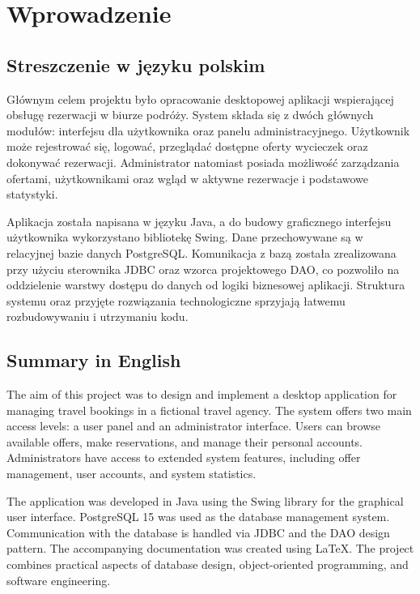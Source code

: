 \chapter{Wprowadzenie}
\label{cha:wprowadzenie}


\section{Streszczenie w języku polskim}
\label{sec:Streszczenie w języku polskim}

Głównym celem projektu było opracowanie desktopowej aplikacji wspierającej obsługę rezerwacji w biurze podróży. System składa się z dwóch głównych modułów: interfejsu dla użytkownika oraz panelu administracyjnego. Użytkownik może rejestrować się, logować, przeglądać dostępne oferty wycieczek oraz dokonywać rezerwacji. Administrator natomiast posiada możliwość zarządzania ofertami, użytkownikami oraz wgląd w aktywne rezerwacje i podstawowe statystyki.

Aplikacja została napisana w języku Java, a do budowy graficznego interfejsu użytkownika wykorzystano bibliotekę Swing. Dane przechowywane są w relacyjnej bazie danych PostgreSQL. Komunikacja z bazą została zrealizowana przy użyciu sterownika JDBC oraz wzorca projektowego DAO, co pozwoliło na oddzielenie warstwy dostępu do danych od logiki biznesowej aplikacji. Struktura systemu oraz przyjęte rozwiązania technologiczne sprzyjają łatwemu rozbudowywaniu i utrzymaniu kodu.

\section{Summary in English}
\label{sec:Summary in English}

The aim of this project was to design and implement a desktop application for managing travel bookings in a fictional travel agency. The system offers two main access levels: a user panel and an administrator interface. Users can browse available offers, make reservations, and manage their personal accounts. Administrators have access to extended system features, including offer management, user accounts, and system statistics.

The application was developed in Java using the Swing library for the graphical user interface. PostgreSQL 15 was used as the database management system. Communication with the database is handled via JDBC and the DAO design pattern. The accompanying documentation was created using \LaTeX{}. The project combines practical aspects of database design, object-oriented programming, and software engineering.


